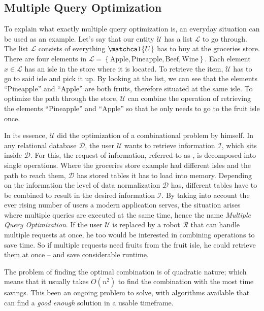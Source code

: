 \subsection{Multiple Query Optimization}
To explain what exactly multiple query optimization is, an everyday situation can be used as an example. Let's say that our entity $\mathcal{U}$ has a list $\mathcal{L}$ to go through. The list $\mathcal{L}$ consists of everything $\matchcal{U}$ has to buy at the groceries store. There are four elements in $\mathcal{L} = \left\{ \text{Apple}, \text{Pineapple}, \text{Beef}, \text{Wine}\right\}$. Each element $x \in \mathcal{L}$ has an isle in the store where it is located. To retrieve the item, $\mathcal{U}$ has to go to said isle and pick it up. By looking at the list, we can see that the elements “Pineapple” and “Apple” are both fruits, therefore situated at the same isle. To optimize the path through the store, $\mathcal{U}$ can combine the operation of retrieving the elements “Pineapple” and “Apple” so that he only needs to go to the fruit isle once. \par
In its essence, $\mathcal{U}$ did the optimization of a combinational problem by himself. In any relational database $\mathcal{D}$, the user $\mathcal{U}$ wants to retrieve information $\mathcal{I}$, which sits inside $\mathcal{D}$. For this, the request of information, referred to as , is decomposed into single operations. Where the groceries store example had different isles and the path to reach them, $\mathcal{D}$ has stored tables it has to load into memory. Depending on the information the level of data normalization $\mathcal{D}$ has\cite{semantic_relational_data_model}, different tables have to be combined to result in the desired information $\mathcal{I}$. By taking into account the ever rising number of users a modern application serves\cite{uber_technologies_inc_uber_2022}, the situation arises where multiple queries are executed at the same time, hence the name \emph{Multiple Query Optimization}. If the user $\mathcal{U}$ is replaced by a robot $\mathcal{R}$ that can handle multiple requests at once, he too would be interested in combining operations to save time. So if multiple requests need fruits from the fruit isle, he could retrieve them at once – and save considerable runtime. \par
The problem of finding the optimal combination is of quadratic nature; which means that it usually takes $O(n^2)$ to find the combination with the most time savings. This been an ongoing problem to solve, with algorithms available that can find a \emph{good enough} solution in a usable timeframe.

